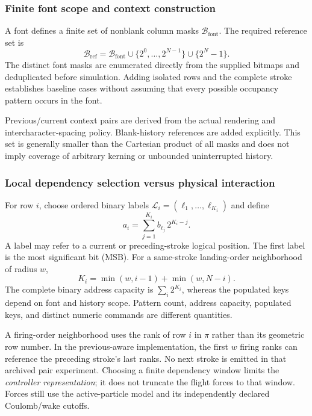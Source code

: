 \subsubsection{Finite font scope and context construction}
A font defines a finite set of nonblank column masks $\mathcal B_{\mathrm{font}}$. The required reference set is
\begin{equation}
 \mathcal B_{\mathrm{ref}}=\mathcal B_{\mathrm{font}}
   \cup\{2^0,\ldots,2^{N-1}\}\cup\{2^N-1\}.
\end{equation}
The distinct font masks are enumerated directly from the supplied bitmaps and deduplicated before simulation. Adding isolated rows and the complete stroke establishes baseline cases without assuming that every possible occupancy pattern occurs in the font.

Previous/current context pairs are derived from the actual rendering and intercharacter-spacing policy. Blank-history references are added explicitly. This set is generally smaller than the Cartesian product of all masks and does not imply coverage of arbitrary kerning or unbounded uninterrupted history.

\subsubsection{Local dependency selection versus physical interaction}
For row $i$, choose ordered binary labels $\mathcal L_i=(\ell_1,\ldots,\ell_{K_i})$ and define
\begin{equation}
 a_i=\sum_{j=1}^{K_i}b_{\ell_j}\,2^{K_i-j}.
\label{eq:address}
\end{equation}
A label may refer to a current or preceding-stroke logical position. The first label is the most significant bit (MSB). For a same-stroke landing-order neighborhood of radius $w$,
\begin{equation}
 K_i=\min(w,i-1)+\min(w,N-i).
\end{equation}
The complete binary address capacity is $\sum_i 2^{K_i}$, whereas the populated keys depend on font and history scope. Pattern count, address capacity, populated keys, and distinct numeric commands are different quantities.

A firing-order neighborhood uses the rank of row $i$ in $\pi$ rather than its geometric row number. In the previous-aware implementation, the first $w$ firing ranks can reference the preceding stroke's last ranks. No next stroke is emitted in that archived pair experiment. Choosing a finite dependency window limits the \emph{controller representation}; it does not truncate the flight forces to that window. Forces still use the active-particle model and its independently declared Coulomb/wake cutoffs.


